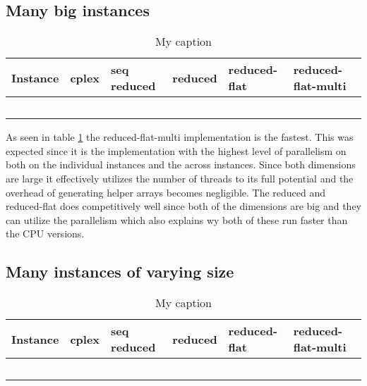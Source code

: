 \subsection{Many big instances}
\begin{table}[H]
	\centering
	\label{table:many_big_instances}
	\begin{tabular}{|l|l|l|l|l|l|}\hline
		Instance & cplex & seq reduced & reduced & reduced-flat & reduced-flat-multi \\\hline
		&       &             &         &              &                    \\\hline
		&       &             &         &              &                    \\\hline
		&       &             &         &              &                   \\\hline
		&       &             &         &              &                   \\\hline
		&       &             &         &              &                   \\\hline
	\end{tabular}
	\caption{My caption}
\end{table}


As seen in table \ref{table:many_big_instances} the reduced-flat-multi implementation is the fastest. This was expected since it is the implementation with the highest level of parallelism on both on the individual instances and the across instances. Since both dimensions are large it effectively utilizes the number of threads to its full potential and the overhead of generating helper arrays becomes negligible. The reduced and reduced-flat does competitively well since both of the dimensions are big and they can utilize the parallelism which also explains wy both of these run faster than the CPU versions.

\subsection{Many instances of varying size}
\begin{table}[H]
	\centering
	\label{table:many_varying_instances}
	\begin{tabular}{|l|l|l|l|l|l|}\hline
		Instance & cplex & seq reduced & reduced & reduced-flat & reduced-flat-multi \\\hline
		&       &             &         &              &                    \\\hline
		&       &             &         &              &                    \\\hline
		&       &             &         &              &                   \\\hline
		&       &             &         &              &                   \\\hline
		&       &             &         &              &                   \\\hline
	\end{tabular}
	\caption{My caption}
\end{table}

